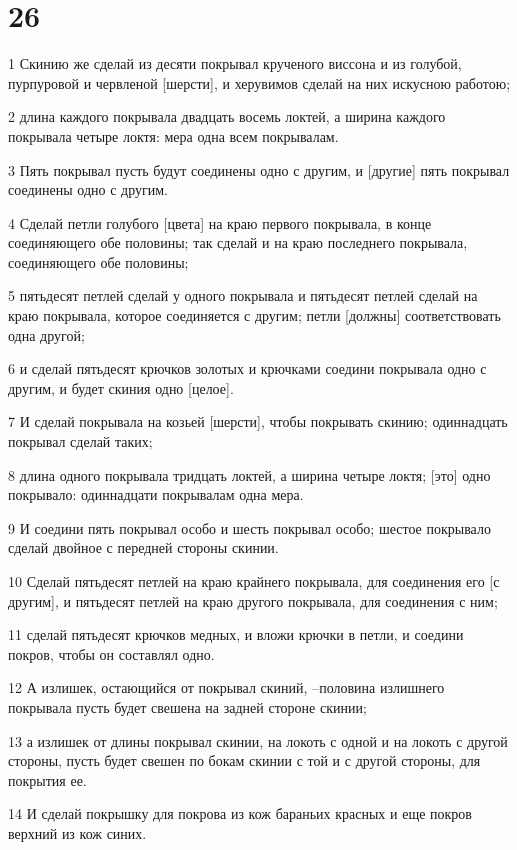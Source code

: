 \chapter{26}

\par 1 Скинию же сделай из десяти покрывал крученого виссона и из голубой, пурпуровой и червленой [шерсти], и херувимов сделай на них искусною работою;
\par 2 длина каждого покрывала двадцать восемь локтей, а ширина каждого покрывала четыре локтя: мера одна всем покрывалам.
\par 3 Пять покрывал пусть будут соединены одно с другим, и [другие] пять покрывал соединены одно с другим.
\par 4 Сделай петли голубого [цвета] на краю первого покрывала, в конце соединяющего обе половины; так сделай и на краю последнего покрывала, соединяющего обе половины;
\par 5 пятьдесят петлей сделай у одного покрывала и пятьдесят петлей сделай на краю покрывала, которое соединяется с другим; петли [должны] соответствовать одна другой;
\par 6 и сделай пятьдесят крючков золотых и крючками соедини покрывала одно с другим, и будет скиния одно [целое].
\par 7 И сделай покрывала на козьей [шерсти], чтобы покрывать скинию; одиннадцать покрывал сделай таких;
\par 8 длина одного покрывала тридцать локтей, а ширина четыре локтя; [это] одно покрывало: одиннадцати покрывалам одна мера.
\par 9 И соедини пять покрывал особо и шесть покрывал особо; шестое покрывало сделай двойное с передней стороны скинии.
\par 10 Сделай пятьдесят петлей на краю крайнего покрывала, для соединения его [с другим], и пятьдесят петлей на краю другого покрывала, для соединения с ним;
\par 11 сделай пятьдесят крючков медных, и вложи крючки в петли, и соедини покров, чтобы он составлял одно.
\par 12 А излишек, остающийся от покрывал скиний, --половина излишнего покрывала пусть будет свешена на задней стороне скинии;
\par 13 а излишек от длины покрывал скинии, на локоть с одной и на локоть с другой стороны, пусть будет свешен по бокам скинии с той и с другой стороны, для покрытия ее.
\par 14 И сделай покрышку для покрова из кож бараньих красных и еще покров верхний из кож синих.
